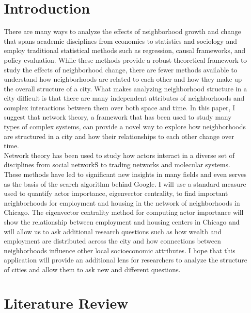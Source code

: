 \documentclass{article}
\theoremstyle{definition}
\theoremstyle{remark}
\begin{document}
\section{Introduction}
There are many ways to analyze the effects of neighborhood growth and change that spans academic disciplines from economics to statistics and sociology and employ traditional statistical methods such as regression, causal frameworks, and policy evaluation.  While these methods provide a robust theoretical framework to study the effects of neighborhood change, there are fewer methods available to understand how neighborhoods are related to each other and how they make up the overall structure of a city.  What makes analyzing neighborhood structure in a city difficult is that there are many independent attributes of neighborhoods and complex interactions between them over both space and time.  In this paper, I suggest that network theory, a framework that has been used to study many types of complex systems, can provide a novel way to explore how neighborhoods are structured in a city and how their relationships to each other change over time.  \\

Network theory has been used to study how actors interact in a diverse set of disciplines from social networkS to trading networks and molecular systems.  These methods have led to significant new insights in many fields and even serves as the basis of the search algorithm behind Google.  I will use a standard measure used to quantify actor importance, eigenvector centrality, to find important neighborhoods for employment and housing in the network of neighborhoods in Chicago.  The eigenvector centrality method for computing actor importance will show the relationship between employment and housing centers in Chicago and will allow us to ask additional research questions such as how wealth and employment are distributed across the city and how connections between neighborhoods influence other local socioeconomic attributes.  I hope that this application will provide an additional lens for researchers to analyze the structure of cities and allow them to ask new and different questions.
\section{Literature Review}
\end{document}
